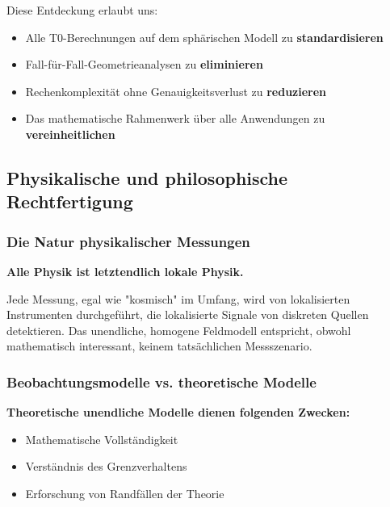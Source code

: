 \documentclass[12pt,a4paper]{article}
\begin{document}
Diese Entdeckung erlaubt uns:
\begin{itemize}
	\item Alle T0-Berechnungen auf dem sphärischen Modell zu \textbf{standardisieren}
	\item Fall-für-Fall-Geometrieanalysen zu \textbf{eliminieren}  
	\item Rechenkomplexität ohne Genauigkeitsverlust zu \textbf{reduzieren}
	\item Das mathematische Rahmenwerk über alle Anwendungen zu \textbf{vereinheitlichen}
\end{itemize}

\subsection{Physikalische und philosophische Rechtfertigung}
\label{subsec:philosophical_justification}

\subsubsection{Die Natur physikalischer Messungen}
\label{subsubsec:nature_physical_measurement}

\begin{tcolorbox}[colback=blue!5!white,colframe=blue!75!black,title=Philosophisches Prinzip]
	\textbf{Alle Physik ist letztendlich lokale Physik.}
	
	Jede Messung, egal wie "kosmisch" im Umfang, wird von lokalisierten Instrumenten durchgeführt, die lokalisierte Signale von diskreten Quellen detektieren. Das unendliche, homogene Feldmodell entspricht, obwohl mathematisch interessant, keinem tatsächlichen Messszenario.
\end{tcolorbox}

\subsubsection{Beobachtungsmodelle vs. theoretische Modelle}
\label{subsubsec:observational_vs_theoretical}

\textbf{Theoretische unendliche Modelle dienen folgenden Zwecken:}
\begin{itemize}
	\item Mathematische Vollständigkeit
	\item Verständnis des Grenzverhaltens  
	\item Erforschung von Randfällen der Theorie
\end{itemize}
\end{document}
